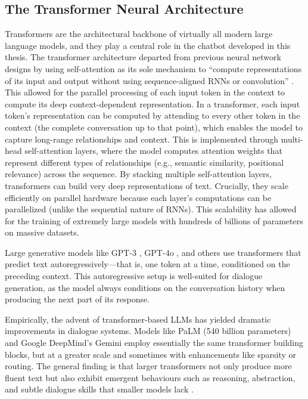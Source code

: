 \subsection*{The Transformer Neural Architecture}
\label{ssec:transformers} 
Transformers are the architectural backbone of virtually all modern large language models, and they play a central role in the chatbot developed in this thesis. The transformer architecture \cite{vaswani2017attention} departed from previous neural network designs by using self-attention as its sole mechanism to “compute representations of its input and output without using sequence-aligned RNNs or convolution” \cite{vaswani2017attention}. This allowed for the parallel processing of each input token in the context to compute its deep context-dependent representation. In a transformer, each input token’s representation can be computed by attending to every other token in the context (the complete conversation up to that point), which enables the model to capture long-range relationships and context. This is implemented through multi-head self-attention layers, where the model computes attention weights that represent different types of relationships (e.g., semantic similarity, positional relevance) across the sequence. By stacking multiple self-attention layers, transformers can build very deep representations of text. Crucially, they scale efficiently on parallel hardware because each layer’s computations can be parallelized (unlike the sequential nature of RNNs). This scalability has allowed for the training of extremely large models with hundreds of billions of parameters on massive datasets.


Large generative models like GPT-3 \cite{brown2020language}, GPT-4o \cite{openai2023gpt4}, and others use transformers that predict text autoregressively—that is, one token at a time, conditioned on the preceding context. This autoregressive setup is well-suited for dialogue generation, as the model always conditions on the conversation history when producing the next part of its response.


Empirically, the advent of transformer-based LLMs has yielded dramatic improvements in dialogue systems. Models like PaLM \cite{chowdhery2022palm} (540 billion parameters) and Google DeepMind’s Gemini \cite{geminiteam2025geminifamilyhighlycapable} employ essentially the same transformer building blocks, but at a greater scale and sometimes with enhancements like sparsity or routing. The general finding is that larger transformers not only produce more fluent text but also exhibit emergent behaviours such as reasoning, abstraction, and subtle dialogue skills that smaller models lack \cite{52065,berti2025emergentabilitieslargelanguage}.



